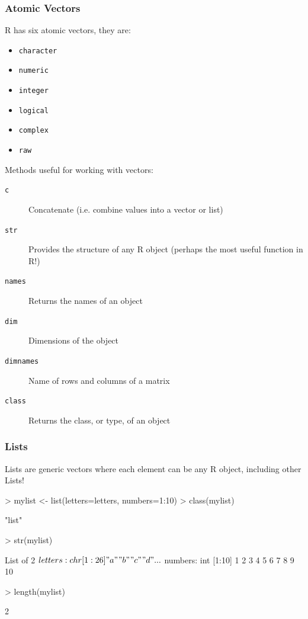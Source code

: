\documentclass[10pt,slidestop,mathserif,c]{beamer}
\begin{document}
\begin{frame}
	\frametitle{Atomic Vectors}
	R has six atomic vectors, they are:
	\begin{itemize}
		\item \texttt{character}
		\item \texttt{numeric}
		\item \texttt{integer}
		\item \texttt{logical}
		\item \texttt{complex}
		\item \texttt{raw}
	\end{itemize}
	\pause
	Methods useful for working with vectors:
	\begin{description}
		\item[\texttt{c}] Concatenate (i.e. combine values into a vector or list)
		\item[\texttt{str}] Provides the structure of any R object (perhaps the most useful function in R!)
		\item[\texttt{names}] Returns the names of an object
		\item[\texttt{dim}] Dimensions of the object
		\item[\texttt{dimnames}] Name of rows and columns of a matrix
		\item[\texttt{class}] Returns the class, or type, of an object
	\end{description}
\end{frame}

\begin{frame}
	\frametitle{Lists}
	Lists are generic vectors where each element can be any R object, including other Lists!
\begin{Schunk}
\begin{Sinput}
> mylist <- list(letters=letters, numbers=1:10)
> class(mylist)
\end{Sinput}
\begin{Soutput}
[1] "list"
\end{Soutput}
\begin{Sinput}
> str(mylist)
\end{Sinput}
\begin{Soutput}
List of 2
 $ letters: chr [1:26] "a" "b" "c" "d" ...
 $ numbers: int [1:10] 1 2 3 4 5 6 7 8 9 10
\end{Soutput}
\begin{Sinput}
> length(mylist)
\end{Sinput}
\begin{Soutput}
[1] 2
\end{Soutput}
\end{Schunk}
\end{frame}
\end{document}
